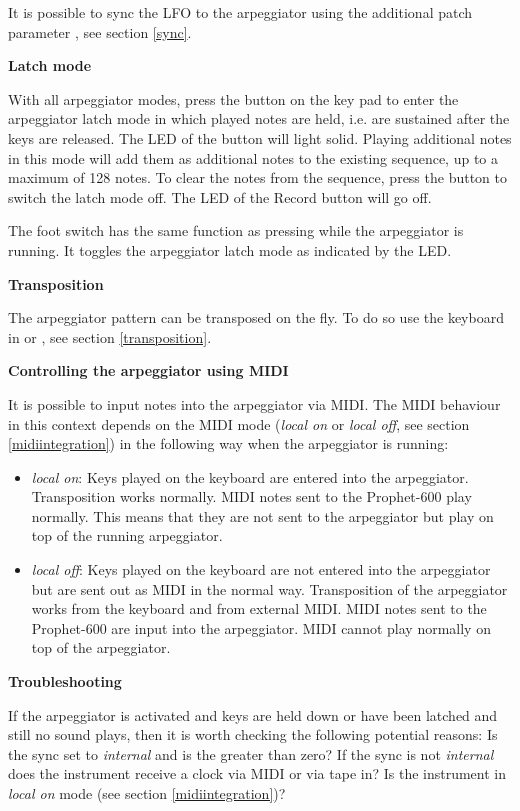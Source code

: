 It is possible to sync the LFO to the arpeggiator using the additional patch parameter \clocksync, see section \ref{sync}.

\textbf{Latch mode}

With all arpeggiator modes, press the \record button on the key pad to enter the arpeggiator latch mode in which played notes are held, i.e. are sustained after the keys are released. The LED of the \record button will light solid. Playing additional notes in this mode will add them as additional notes to the existing sequence, up to a maximum of 128 notes. To clear the notes from the sequence, press the \record button to switch the latch mode off. The LED of the Record button will go off.

The foot switch has the same function as pressing \record while the arpeggiator is running. It toggles the arpeggiator latch mode as indicated by the \record LED. 

\textbf{Transposition}

The arpeggiator pattern can be transposed on the fly. To do so use the keyboard in \shiftmode or \shiftlock, see section \ref{transposition}.

\textbf{Controlling the arpeggiator using MIDI}

It is possible to input notes into the arpeggiator via MIDI. The MIDI behaviour in this context depends on the MIDI mode (\textit{local on} or \textit{local off}, see section \ref{midiintegration}) in the following way when the arpeggiator is running:

\begin{itemize}
  \item \textit{local on}: Keys played on the keyboard are entered into the arpeggiator. Transposition works normally. MIDI notes sent to the Prophet-600 play normally. This means that they are not sent to the arpeggiator but play on top of the running arpeggiator.
  \item \textit{local off}: Keys played on the keyboard are not entered into the arpeggiator but are sent out as MIDI in the normal way. Transposition of the arpeggiator works from the keyboard and from external MIDI. MIDI notes sent to the Prophet-600 are input into the arpeggiator. MIDI cannot play normally on top of the arpeggiator. 
\end{itemize}

\textbf{Troubleshooting}

If the arpeggiator is activated and keys are held down or have been latched and still no sound plays, then it is worth checking the following potential reasons: Is the sync set to \textit{internal} and is the \clock greater than zero? If the sync is not \textit{internal} does the instrument receive a clock via MIDI or via tape in? Is the instrument in \textit{local on} mode (see section \ref{midiintegration})?

